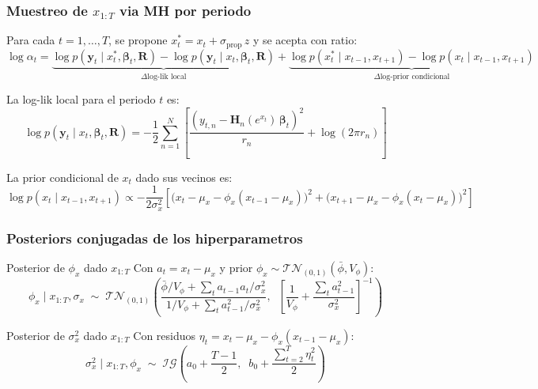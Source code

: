 \documentclass[12pt, a4paper]{article}
\theoremstyle{plain}
\theoremstyle{definition}
\theoremstyle{remark}
\newcommand{\bbet}{\bm{\beta}}
\newcommand{\by}{\mathbf{y}}
\newcommand{\bH}{\mathbf{H}}
\newcommand{\bR}{\mathbf{R}}
\newcommand{\IG}{\mathcal{IG}}
\newcommand{\TN}{\mathcal{TN}}
\begin{document}
\subsubsection{Muestreo de $x_{1:T}$ via MH por periodo}

Para cada $t = 1,\ldots,T$, se propone $x_t^* = x_t + \sigma_\text{prop}\,z$
y se acepta con ratio:
\begin{equation}
  \log\alpha_t =
  \underbrace{
    \log p(\by_t \mid x_t^*, \bbet_t, \bR)
    - \log p(\by_t \mid x_t,  \bbet_t, \bR)
  }_{\Delta\text{log-lik local}}
  +
  \underbrace{
    \log p(x_t^* \mid x_{t-1}, x_{t+1})
    - \log p(x_t  \mid x_{t-1}, x_{t+1})
  }_{\Delta\text{log-prior condicional}}
  \label{eq:mh_ar1}
\end{equation}

La log-lik local para el periodo $t$ es:
\begin{equation}
  \log p(\by_t \mid x_t, \bbet_t, \bR) =
  -\frac{1}{2}\sum_{n=1}^N \left[
    \frac{(y_{t,n} - \bH_n(e^{x_t})\,\bbet_t)^2}{r_n}
    + \log(2\pi r_n)
  \right]
  \label{eq:loglik_local}
\end{equation}

La prior condicional de $x_t$ dado sus vecinos es:
\begin{equation}
  \log p(x_t \mid x_{t-1}, x_{t+1}) \propto
  -\frac{1}{2\sigma_x^2}\!\left[
    \bigl(x_t - \mu_x - \phi_x(x_{t-1}-\mu_x)\bigr)^2 +
    \bigl(x_{t+1} - \mu_x - \phi_x(x_t - \mu_x)\bigr)^2
  \right]
  \label{eq:ar1_cond}
\end{equation}

\subsubsection{Posteriors conjugadas de los hiperparametros}

\begin{teoremabox}{Posterior de $\phi_x$ dado $x_{1:T}$}
Con $a_t = x_t - \mu_x$ y prior $\phi_x \sim \TN_{(0,1)}(\bar{\phi}, V_\phi)$:
\begin{equation}
  \phi_x \mid x_{1:T}, \sigma_x \;\sim\;
  \TN_{(0,1)}\!\left(
    \frac{\bar{\phi}/V_\phi + \sum_t a_{t-1}a_t/\sigma_x^2}
         {1/V_\phi + \sum_t a_{t-1}^2/\sigma_x^2},\;\;
    \left[\frac{1}{V_\phi} + \frac{\sum_t a_{t-1}^2}{\sigma_x^2}\right]^{-1}
  \right)
  \label{eq:post_phi_x}
\end{equation}
\end{teoremabox}

\begin{teoremabox}{Posterior de $\sigma_x^2$ dado $x_{1:T}$}
Con residuos $\eta_t = x_t - \mu_x - \phi_x(x_{t-1}-\mu_x)$:
\begin{equation}
  \sigma_x^2 \mid x_{1:T}, \phi_x \;\sim\;
  \IG\!\left(a_0 + \frac{T-1}{2},\;\;
    b_0 + \frac{\sum_{t=2}^T \eta_t^2}{2}\right)
  \label{eq:post_sigma_x}
\end{equation}
\end{teoremabox}
\end{document}

